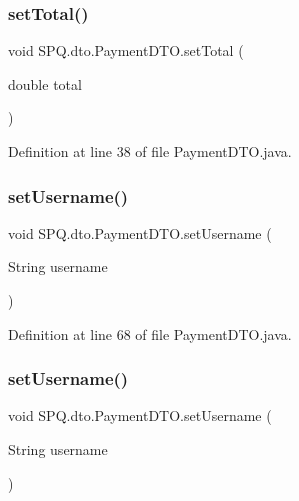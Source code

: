 \subsubsection{\texorpdfstring{set\+Total()}{setTotal()}\hspace{0.1cm}{\footnotesize\ttfamily [3/3]}}
{\footnotesize\ttfamily void S\+P\+Q.\+dto.\+Payment\+D\+T\+O.\+set\+Total (\begin{DoxyParamCaption}\item[{double}]{total }\end{DoxyParamCaption})}



Definition at line 38 of file Payment\+D\+T\+O.\+java.

\mbox{\label{class_s_p_q_1_1dto_1_1_payment_d_t_o_aaad1620f8f86cb26566476c22bfcd3af}} 
\subsubsection{\texorpdfstring{set\+Username()}{setUsername()}\hspace{0.1cm}{\footnotesize\ttfamily [1/3]}}
{\footnotesize\ttfamily void S\+P\+Q.\+dto.\+Payment\+D\+T\+O.\+set\+Username (\begin{DoxyParamCaption}\item[{String}]{username }\end{DoxyParamCaption})}



Definition at line 68 of file Payment\+D\+T\+O.\+java.

\mbox{\label{class_s_p_q_1_1dto_1_1_payment_d_t_o_aaad1620f8f86cb26566476c22bfcd3af}} 
\subsubsection{\texorpdfstring{set\+Username()}{setUsername()}\hspace{0.1cm}{\footnotesize\ttfamily [2/3]}}
{\footnotesize\ttfamily void S\+P\+Q.\+dto.\+Payment\+D\+T\+O.\+set\+Username (\begin{DoxyParamCaption}\item[{String}]{username }\end{DoxyParamCaption})}



